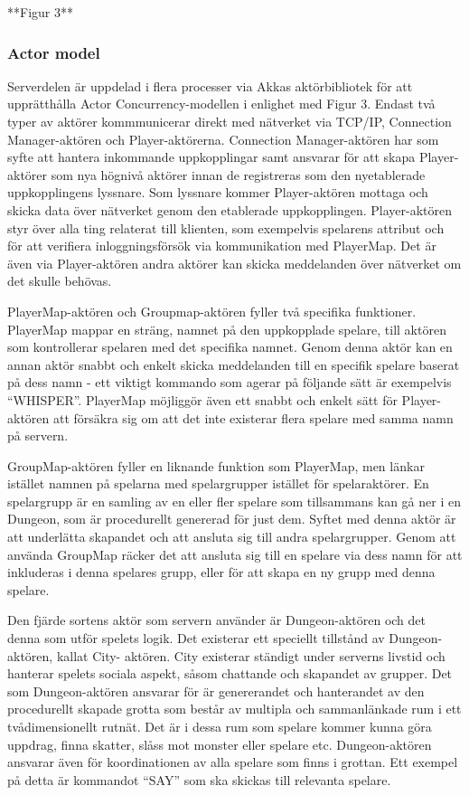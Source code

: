 \documentclass[a4paper]{article}
\begin{document}
**Figur 3**

\subsubsection{Actor model}
Serverdelen är uppdelad i flera processer via Akkas aktörbibliotek för att upprätthålla Actor Concurrency-modellen i enlighet med Figur 3. Endast två typer av aktörer kommmunicerar 
direkt med nätverket via TCP/IP, Connection Manager-aktören och Player-aktörerna. Connection Manager-aktören har som syfte att hantera inkommande uppkopplingar samt ansvarar 
för att skapa Player-aktörer som nya högnivå aktörer innan de registreras som den nyetablerade uppkopplingens lyssnare. Som lyssnare kommer Player-aktören mottaga och skicka data 
över nätverket genom den etablerade uppkopplingen. Player-aktören styr över alla ting relaterat till klienten, som exempelvis spelarens attribut och för att verifiera 
inloggningsförsök via kommunikation med PlayerMap. Det är även via Player-aktören andra aktörer kan skicka meddelanden över nätverket om det skulle behövas. 

PlayerMap-aktören och Groupmap-aktören fyller två specifika funktioner. PlayerMap mappar en sträng, namnet på den uppkopplade spelare, till aktören som kontrollerar 
spelaren med det specifika namnet. Genom denna aktör kan en annan aktör snabbt och enkelt skicka meddelanden till en specifik spelare baserat på dess namn - 
ett viktigt kommando som agerar på följande sätt är exempelvis “WHISPER”. PlayerMap möjliggör även ett snabbt och enkelt sätt för Player-aktören att försäkra 
sig om att det inte existerar flera spelare med samma namn på servern.

GroupMap-aktören fyller en liknande funktion som PlayerMap, men länkar istället namnen på spelarna med spelargrupper istället för spelaraktörer. 
En spelargrupp är en samling av en eller fler spelare som tillsammans kan gå ner i en Dungeon, som är procedurellt genererad för just dem. Syftet med 
denna aktör är att underlätta skapandet och att ansluta sig till andra spelargrupper. Genom att använda GroupMap räcker det att ansluta sig till en 
spelare via dess namn för att inkluderas i denna spelares grupp, eller för att skapa en ny grupp med denna spelare.

Den fjärde sortens aktör som servern använder är Dungeon-aktören och det denna som utför spelets logik. 
Det existerar ett speciellt tillstånd av Dungeon-aktören, kallat City- aktören. City existerar ständigt 
under serverns livstid och hanterar spelets sociala aspekt, såsom chattande och skapandet av grupper. 
Det som Dungeon-aktören ansvarar för är genererandet och hanterandet av den procedurellt skapade 
grotta som består av multipla och sammanlänkade rum i ett tvådimensionellt rutnät. Det är i dessa rum som spelare kommer kunna göra uppdrag, 
finna skatter, slåss mot monster eller spelare etc. Dungeon-aktören ansvarar även för koordinationen av alla spelare som finns i grottan. 
Ett exempel på detta är kommandot “SAY”  som ska skickas till relevanta spelare. 
\end{document}
